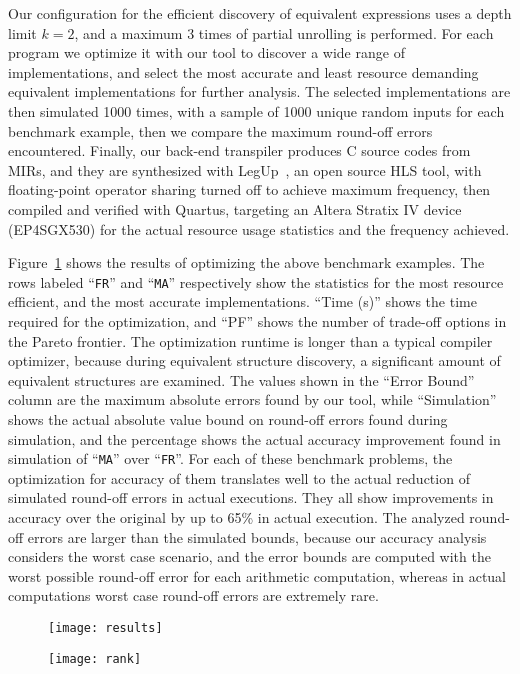 Our configuration for the efficient discovery of equivalent expressions
uses a depth limit $k = 2$, and a maximum 3 times of partial unrolling is
performed.  For each program we optimize it with our tool to discover a wide
range of implementations, and select the most accurate and least resource
demanding equivalent implementations for further analysis.  The selected
implementations are then simulated 1000 times, with a sample of 1000 unique
random inputs for each benchmark example, then we compare the maximum round-off
errors encountered.  Finally, our back-end transpiler produces C source codes
from MIRs, and they are synthesized with LegUp~\cite{legup}, an open source
HLS tool, with floating-point operator sharing turned off to achieve maximum
frequency, then compiled and verified with Quartus, targeting an Altera
Stratix IV device (EP4SGX530) for the actual resource usage statistics and the
frequency achieved.

Figure~\ref{fig:results} shows the results of optimizing the above benchmark
examples.  The rows labeled ``\texttt{FR}'' and ``\texttt{MA}'' respectively
show the statistics for the most resource efficient, and the most accurate
implementations.  ``Time (s)'' shows the time required for the optimization,
and ``PF'' shows the number of trade-off options in the Pareto frontier.  The
optimization runtime is longer than a typical compiler optimizer, because
during equivalent structure discovery, a significant amount of equivalent
structures are examined.  The values shown in the ``Error Bound'' column are
the maximum absolute errors found by our tool, while ``Simulation'' shows the
actual absolute value bound on round-off errors found during simulation, and
the percentage shows the actual accuracy improvement found in simulation of
``\texttt{MA}'' over ``\texttt{FR}''.  For each of these benchmark problems,
the optimization for accuracy of them translates well to the actual reduction
of simulated round-off errors in actual executions.  They all show improvements
in accuracy over the original by up to 65\% in actual execution.  The analyzed
round-off errors are larger than the simulated bounds, because our accuracy
analysis considers the worst case scenario, and the error bounds are computed
with the worst possible round-off error for each arithmetic computation,
whereas in actual computations worst case round-off errors are extremely rare.

\begin{figure}[ht]
    \centering
    \texttt{[image: results]}
    \label{fig:results}
\end{figure}
\begin{figure}[ht]
    \centering
    \texttt{[image: rank]}
    \label{fig:rank}
\end{figure}


